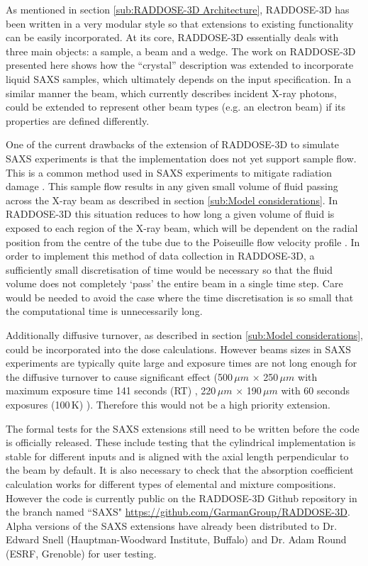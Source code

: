 As mentioned in section \ref{sub:RADDOSE-3D Architecture}, RADDOSE-3D has been written in a very modular style so that extensions to existing functionality can be easily incorporated.
At its core, RADDOSE-3D essentially deals with three main objects: a sample, a beam and a wedge.
The work on RADDOSE-3D presented here shows how the ``crystal'' description was extended to incorporate liquid SAXS samples, which ultimately depends on the input specification.
In a similar manner the beam, which currently describes incident X-ray photons, could be extended to represent other beam types (e.g. an electron beam) if its properties are defined differently.

One of the current drawbacks of the extension of RADDOSE-3D to simulate SAXS experiments is that the implementation does not yet support sample flow.
This is a common method used in SAXS experiments to mitigate radiation damage \cite{jeffries2015limiting}.
This sample flow results in any given small volume of fluid passing across the X-ray beam as described in section \ref{sub:Model considerations}.
In RADDOSE-3D this situation reduces to how long a given volume of fluid is exposed to each region of the X-ray beam, which will be dependent on the radial position from the centre of the tube due to the Poiseuille flow velocity profile \cite{hopkins2016quantifying}.
In order to implement this method of data collection in RADDOSE-3D, a sufficiently small discretisation of time would be necessary so that the fluid volume does not completely `pass' the entire beam in a single time step.
Care would be needed to avoid the case where the time discretisation is so small that the computational time is unnecessarily long.

Additionally diffusive turnover, as described in section \ref{sub:Model considerations}, could be incorporated into the dose calculations.
However beams sizes in SAXS experiments are typically quite large and exposure times are not long enough for the diffusive turnover to cause significant effect (500$\,\mu m$ $\times$ 250$\,\mu m$ with maximum exposure time 141 seconds (RT) \cite{jeffries2015limiting}, 220$\,\mu m$ $\times$ 190$\,\mu m$ with 60 seconds exposures (100$\,$K) \cite{meisburger2013breaking}).
Therefore this would not be a high priority extension.

The formal tests for the SAXS extensions still need to be written before the code is officially released.
These include testing that the cylindrical implementation is stable for different inputs and is aligned with the axial length perpendicular to the beam by default.
It is also necessary to check that the absorption coefficient calculation works for different types of elemental and mixture compositions.
However the code is currently public on the RADDOSE-3D Github repository in the branch named ``SAXS" \url{https://github.com/GarmanGroup/RADDOSE-3D}.
Alpha versions of the SAXS extensions have already been distributed to Dr. Edward Snell (Hauptman-Woodward Institute, Buffalo) and Dr. Adam Round (ESRF, Grenoble) for user testing.

